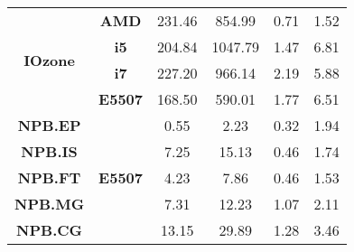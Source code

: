 \documentclass{sig-alternate}
\begin{document}
\begin{table}[!htbp]
\begin{center}
\begin{tabular}{|c||c||c|c||c|c|}
\multirow{4}{*}{\textbf{IOzone}}	&	 \textbf{AMD}	&	231.46	&	854.99	&	0.71	&	1.52	\\ \cline{2-6}
	&	 \textbf{i5}	&	204.84	&	1047.79	&	1.47	&	6.81	\\ \cline{2-6}
	&	 \textbf{i7}	&	227.20	&	966.14	&	2.19	&	5.88	\\ \cline{2-6}
	&	 \textbf{E5507}	&	168.50	&	590.01	&	1.77	&	6.51	\\ \hline\hline
											


\multirow{1}{*}{\textbf{NPB.EP}}	&	\multirow{5}{*}{\textbf{E5507}}	&	0.55	&	2.23	&	0.32	&	1.94	\\ \cline{3-6}
\multirow{1}{*}{\textbf{NPB.IS}}	&		&	7.25	&	15.13	&	0.46	&	1.74	\\ \cline{3-6}
\multirow{1}{*}{\textbf{NPB.FT}}	&		&	4.23	&	7.86	&	0.46	&	1.53	\\ \cline{3-6}
\multirow{1}{*}{\textbf{NPB.MG}}	&		&	7.31	&	12.23	&	1.07	&	2.11	\\ \cline{3-6}
\multirow{1}{*}{\textbf{NPB.CG}}	&		&	13.15	&	29.89	&	1.28	&	3.46	\\ \hline

\end{tabular}
\label{ctval}
\end{center}
\end{table}
\end{document}
